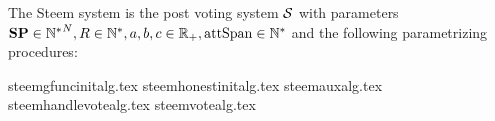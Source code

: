\begin{definition}
  The Steem system is the post voting system $\mathcal{S}$ with parameters
  $\mathrm{\textbf{SP}} \in {\mathbb{N}^*}^N, R \in \mathbb{N}^*, a, b, c \in
  \mathbb{R}_{+}, \mathrm{attSpan} \in \mathbb{N}^*$ and the following parametrizing
  procedures:
\end{definition}
{steemgfuncinitalg.tex}
{steemhonestinitalg.tex}
{steemauxalg.tex}
{steemhandlevotealg.tex}
{steemvotealg.tex}
